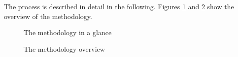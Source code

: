 \documentclass[12pt]{report}
\begin{document}
The process is described in detail in the following. Figures \ref{FlowChart} and \ref{FlowChartOverview} show the overview of the methodology.

\begin{figure}[!ht]
\centering
{}
\caption{The methodology in a glance}
\label{FlowChart}
\end{figure}

\begin{figure}[!ht]
\centering
{}
\caption{The methodology overview}
\label{FlowChartOverview}
\end{figure}

%
%
%
%
\end{document}
